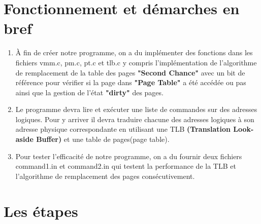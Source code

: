 \documentclass{article}
\begin{document}
\section{Fonctionnement et démarches en bref}
\begin{enumerate}
\item À fin de créer notre programme, on a du implémenter des fonctions dans les fichiers vmm.c, pm.c, pt.c et tlb.c y compris l'implémentation de l'algorithme de remplacement de la table des pages \textbf{"Second Chance"} avec un bit de référence pour vérifier si la page dans \textbf{"Page Table"} a été accédée ou pas ainsi que la gestion de l'état \textbf{"dirty"} des pages.
\item Le programme devra lire et exécuter une liste de commandes sur des
adresses logiques. Pour y arriver il devra traduire chacune des adresses logiques
à son adresse physique correspondante en utilisant une TLB \textbf{(Translation Look-aside Buffer)} et une table de pages(page table).
\item Pour tester l'efficacité de notre programme, on a du fournir deux fichiers command1.in et command2.in qui testent la performance de la TLB et l'algorithme de remplacement des pages consécutivement. 
\end{enumerate}

\section{Les étapes}
\end{document}
